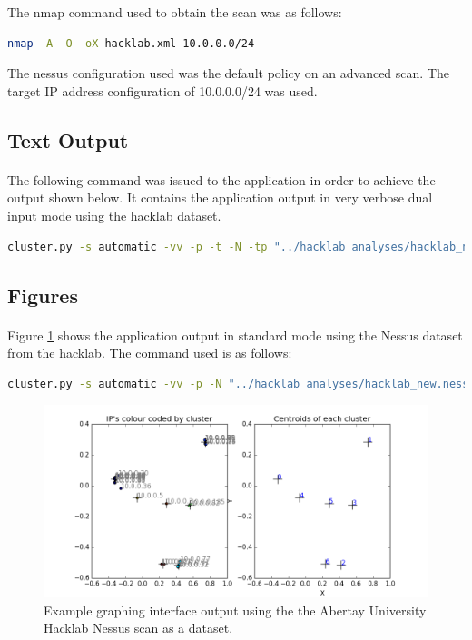 The nmap command used to obtain the scan was as follows:
\begin{lstlisting}[language=bash]
nmap -A -O -oX hacklab.xml 10.0.0.0/24
\end{lstlisting}
The nessus configuration used was the default policy on an advanced scan. The target IP address configuration of 10.0.0.0/24 was used.

\subsection{Text Output}
\label{hacklabtext}
\paragraph{}The following command was issued to the application in order to achieve the output shown below. It contains the application output in very verbose dual input mode using the hacklab dataset.
\begin{lstlisting}[language=bash]
cluster.py -s automatic -vv -p -t -N -tp "../hacklab analyses/hacklab_new.xml" "../hacklab analyses/hacklab_new.nessus"
\end{lstlisting}




\subsection{Figures}
\paragraph{}Figure \ref{split_nessus} shows the application output in standard mode using the Nessus dataset from the hacklab. The command used is as follows:
\begin{lstlisting}[language=bash]
cluster.py -s automatic -vv -p -N "../hacklab analyses/hacklab_new.nessus"
\end{lstlisting}
\begin{figure}[!h]
\centering
\includegraphics[width=5.5in]{./Figures/split_nessus.png}
\caption{Example graphing interface output using the the Abertay University Hacklab Nessus scan as a dataset.}
\label{split_nessus}
\end{figure}

